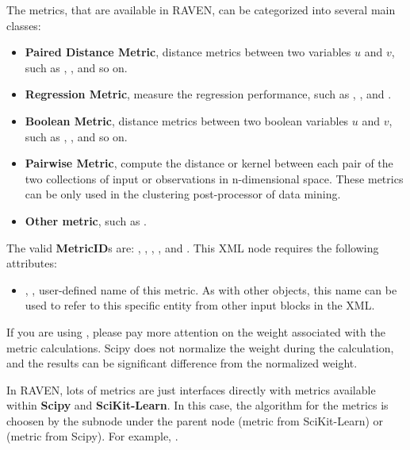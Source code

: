 The metrics, that are available in RAVEN, can be categorized into several main classes:
\begin{itemize}
  \item \textbf{Paired Distance Metric}, distance metrics between two variables $u$ and $v$, such as ,
    ,  and so on.
  \item \textbf{Regression Metric}, measure the regression performance, such as ,
    ,  and .
  \item \textbf{Boolean Metric}, distance metrics between two boolean variables $u$ and $v$, such as
    , ,  and so on.
  \item \textbf{Pairwise Metric}, compute the distance or kernel between each pair of the two collections of input
    or observations in n-dimensional space.
    \nb These metrics can be only used in the clustering post-processor of data mining. 
  \item \textbf{Other metric}, such as .
\end{itemize}

The valid \textbf{MetricID}s are: , , , ,
and . This XML node requires the following attributes:
\begin{itemize}
  \item {}, , user-defined name of this metric. \nb As with other
    objects, this name can be used to refer to this specific entity from other input blocks in the XML.
\end{itemize}

\nb If you are using , please pay more attention on the weight associated with the metric
calculations. Scipy does not normalize the weight during the calculation, and the results can be significant difference
from the normalized weight.

In RAVEN, lots of metrics are just interfaces directly with metrics available within \textbf{Scipy} and
\textbf{SciKit-Learn}. In this case, the algorithm for the metrics is choosen by the subnode 
under the parent node  (metric from SciKit-Learn) or  (metric from Scipy). For
example, .

